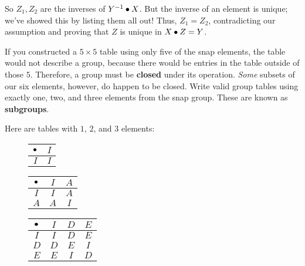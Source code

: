 \documentclass[../key.tex]{subfiles}
\begin{document}
\noindent So $Z_1,Z_2$ are the inverses of $Y^{-1}\bullet X$. But the inverse of an element is unique; we've showed this by listing them all out! Thus, $Z_1=Z_2$, contradicting our assumption and proving that $Z$ is unique in $X\bullet Z = Y$.

\begin{outer_problem}
\item If you constructed a $5\times 5$ table using only five of the snap elements, the table would not describe a group, because there would be entries in the table outside of those $5$. Therefore, a group must be \textbf{closed} under its operation. \textit{Some} subsets of our six elements, however, do happen to be closed. Write valid group tables using exactly one, two, and three elements from the snap group. These are known as \textbf{subgroups}.\label{prob:group_definition_end}
\end{outer_problem}

Here are tables with $1$, $2$, and $3$ elements:
\begin{figure}[h]
	\begin{center}
		\begin{minipage}[t]{0.3\textwidth}
			\centering
			\begin{tabular}{c|c}
				\hline
				$\bullet$ & $I$ \\ \hline
				\rowcolor{light-gray}
				$I$ & $I$ \\ \hline
			\end{tabular}
			\vspace*{0.5\baselineskip}
		\end{minipage}
		\hfill
		\begin{minipage}[t]{0.3\textwidth}
			\centering
			\begin{tabular}{c|cc}
				\hline
				$\bullet$ & $I$ & $A$ \\ \hline
				\rowcolor{light-gray}
				$I$ & $I$ & $A$ \\
				$A$ & $A$ & $I$ \\ \hline
			\end{tabular}
			\vspace*{0.5\baselineskip}
		\end{minipage}
		\hfill
		\begin{minipage}[t]{0.3\textwidth}
			\centering
			\begin{tabular}{c|ccc}
				\hline
				$\bullet$ & $I$ & $D$ & $E$ \\ \hline
				\rowcolor{light-gray}
				$I$ & $I$ & $D$ & $E$ \\
				$D$ & $D$ & $E$ & $I$ \\
				\rowcolor{light-gray}
				$E$ & $E$ & $I$ & $D$ \\ \hline
			\end{tabular}
			\vspace*{0.5\baselineskip}
		\end{minipage}
	\end{center}
	\vspace*{-2\baselineskip}
\end{figure}
\end{document}
